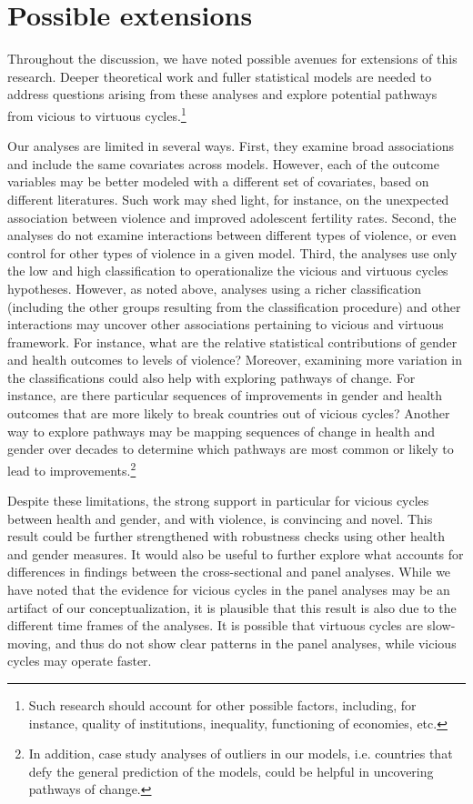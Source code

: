 \documentclass[12pt]{article}
\begin{document}
\section{Possible extensions}

Throughout the discussion, we have noted possible avenues for extensions of this research.
Deeper theoretical work and fuller statistical models are needed to address questions arising from these analyses and explore potential pathways from vicious to virtuous cycles.\footnote{Such research should account for other possible factors, including, for instance, quality of institutions, inequality, functioning of economies, etc.}

Our analyses are limited in several ways.
First, they examine broad associations and include the same covariates across models.
However, each of the outcome variables may be better modeled with a different set of covariates, based on different literatures.
Such work may shed light, for instance, on the unexpected association between violence and improved adolescent fertility rates.
Second, the analyses do not examine interactions between different types of violence, or even control for other types of violence in a given model.
Third, the analyses use only the low and high classification to operationalize the vicious and virtuous cycles hypotheses.
However, as noted above, analyses using a richer classification (including the other groups resulting from the classification procedure) and other interactions may uncover other associations pertaining to vicious and virtuous framework.
For instance, what are the relative statistical contributions of gender and health outcomes to levels of violence?
Moreover, examining more variation in the classifications could also help with exploring pathways of change. For instance, are there particular sequences of improvements in gender and health outcomes that are more likely to break countries out of vicious cycles?
Another way to explore pathways may be mapping sequences of change in health and gender over decades to determine which pathways are most common or likely to lead to improvements.\footnote{In addition, case study analyses of outliers in our models, i.e. countries that defy the general prediction of the models, could be helpful in uncovering pathways of change.}

Despite these limitations, the strong support in particular for vicious cycles between health and gender, and with violence, is convincing and novel.
This result could be further strengthened with robustness checks using other health and gender measures.
It would also be useful to further explore what accounts for differences in findings between the cross-sectional and panel analyses.
While we have noted that the evidence for vicious cycles in the panel analyses may be an artifact of our conceptualization, it is plausible that this result is also due to the different time frames of the analyses. It is possible that virtuous cycles are slow-moving, and thus do not show clear patterns in the panel analyses, while vicious cycles may operate faster.
\end{document}
